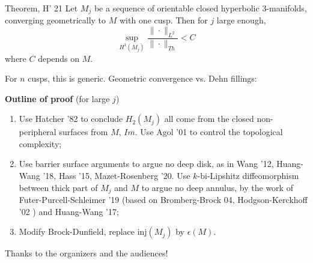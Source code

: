 \documentclass[t]{beamer}
\newcommand{\inj}{\text{inj}}
\begin{document}
\begin{frame}[t]
	\begin{block}{Theorem, H' 21}
		Let $M_j$ be a sequence of orientable closed hyperbolic $3$-manifolds, converging geometrically to $M$ with one cusp. Then for $j$ large enough,
		\begin{equation}
			\sup_{H^1(M_j)} \frac{\|\cdot \|_{L^2}}{\|\cdot \|_{Th}} < C
		\end{equation}
		where $C$ depends on $M$. 
	\end{block}
For $n$ cusps, this is generic. 
Geometric convergence vs. Dehn fillings: 
\end{frame}

\begin{frame}[t]
	\textbf{Outline of proof}
	(for large $j$)
	\begin{enumerate}
		\item Use Hatcher '82 to conclude $H_2(M_j)$ all come from the closed non-peripheral surfaces from $M$, $Im$. Use Agol '01 to control the topological complexity;
		\vfill
		\item Use barrier surface arguments to argue no deep disk, as in Wang '12, Huang-Wang '18, Hass '15, Mazet-Rosenberg '20. Use $k$-bi-Lipshitz diffeomorphism between thick part of $M_j$ and $M$ to argue no deep annulus, by the work of Futer-Purcell-Schleimer '19 (based on Bromberg-Brock 04, Hodgson-Kerckhoff '02 ) and Huang-Wang '17;
		\vfill
		\item Modify Brock-Dunfield, replace $\inj(M_j)$ by $\epsilon(M)$. 
		\vfill
	\end{enumerate}
\end{frame}

\begin{frame}
\huge	Thanks to the organizers and the audiences!
\end{frame}




  
\end{document}
